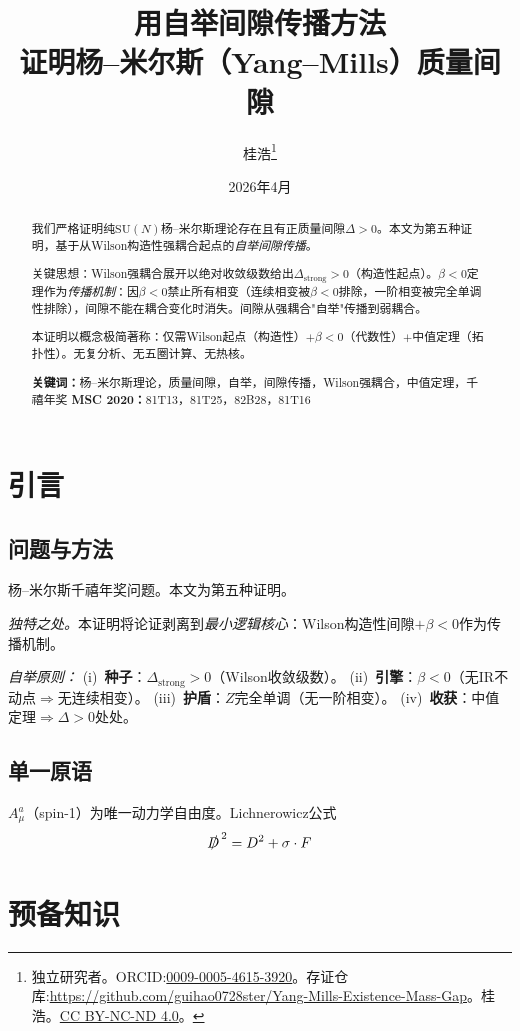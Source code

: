 \documentclass[12pt,a4paper]{article}
\title{\textbf{用自举间隙传播方法\\[4pt]证明杨--米尔斯（Yang--Mills）质量间隙}}
\author{桂浩\thanks{独立研究者。ORCID:\href{https://orcid.org/0009-0005-4615-3920}{0009-0005-4615-3920}。\newline 存证仓库:\url{https://github.com/guihao0728ster/Yang-Mills-Existence-Mass-Gap}。\newline\textcopyright\;2026\;桂浩。\href{https://creativecommons.org/licenses/by-nc-nd/4.0/}{CC BY-NC-ND 4.0}。}}
\date{2026年4月}
\theoremstyle{plain}
\theoremstyle{definition}\newtheorem{definition}[theorem]{定义}
\theoremstyle{remark}\newtheorem{remark}[theorem]{注记}
\begin{document}
\maketitle
\begin{abstract}
我们严格证明纯$\mathrm{SU}(N)$杨--米尔斯理论存在且有正质量间隙$\Delta>0$。本文为第五种证明，基于从Wilson构造性强耦合起点的\emph{自举间隙传播}。

关键思想：Wilson强耦合展开\cite{Wilson1974}以绝对收敛级数给出$\Delta_{\mathrm{strong}}>0$（构造性起点）。$\beta<0$定理作为\emph{传播机制}：因$\beta<0$禁止所有相变（连续相变被$\beta<0$排除，一阶相变被完全单调性排除），间隙不能在耦合变化时消失。间隙从强耦合"自举"传播到弱耦合。

本证明以概念极简著称：仅需Wilson起点（构造性）$+\beta<0$（代数性）$+$中值定理（拓扑性）。无复分析、无五圈计算、无热核。

\medskip\noindent\textbf{关键词：}杨--米尔斯理论，质量间隙，自举，间隙传播，Wilson强耦合，中值定理，千禧年奖
\medskip\noindent\textbf{MSC 2020：}81T13，81T25，82B28，81T16
\end{abstract}
\tableofcontents
\section{引言}\label{sec:intro}
\subsection{问题与方法}\label{sec:approach}
杨--米尔斯千禧年奖问题\cite{JaffeWitten2000}。本文为第五种证明。

\textit{独特之处。}本证明将论证剥离到\emph{最小逻辑核心}：Wilson构造性间隙$+\beta<0$作为传播机制。

\textit{自举原则：}
(i)~\textbf{种子}：$\Delta_{\mathrm{strong}}>0$（Wilson收敛级数）。
(ii)~\textbf{引擎}：$\beta<0$（无IR不动点$\Rightarrow$无连续相变）。
(iii)~\textbf{护盾}：$Z$完全单调（无一阶相变）。
(iv)~\textbf{收获}：中值定理$\Rightarrow\Delta>0$处处。
\subsection{单一原语}\label{sec:primitive}
$A_\mu^a$（spin-1）为唯一动力学自由度。Lichnerowicz公式
\begin{equation}\label{eq:Lich}
\slashed{D}^{\,2}=D^2+\sigma\cdot F
\end{equation}
\section{预备知识}\label{sec:prelim}
\end{document}
